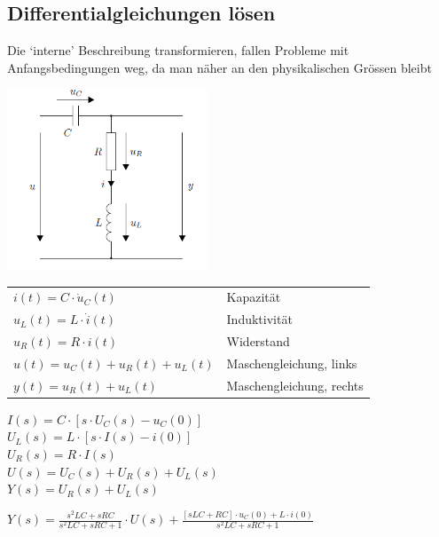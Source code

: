 \subsection{Differentialgleichungen lösen}
Die ‘interne’ Beschreibung transformieren, fallen Probleme mit Anfangsbedingungen weg, da man näher
an den physikalischen Grössen bleibt
\begin{multicols}{2}
		\begin{center}
			\includegraphics[width=6cm]{./images/diffgleichung.png}
		\end{center}
	\columnbreak
\begin{center}
	\begin{tabular}{ll}
		$i(t) = C \cdot \dot{u}_{C}(t)$ & Kapazität  \\
		$u_{L}(t) = L \cdot \dot{i}(t)$ & Induktivität \\
		$u_{R}(t) = R \cdot i(t)$ & Widerstand \\
		$u(t) = u_{C}(t) + u_{R}(t) + u_{L}(t)$ & Maschengleichung, links \\
		$y(t) = u_{R}(t) + u_{L}(t)$ & Maschengleichung, rechts \\
	\end{tabular}
\end{center}
\end{multicols}

\begin{multicols}{2}
{	$I(s) = C  \cdot  [s  \cdot  U_{C}(s) - u_{C}(0)]$ \\
	$U_{L}(s) = L  \cdot  [s  \cdot  I(s) - i(0)]$ \\
	$U_{R}(s) = R  \cdot  I(s)$ \\
	$U(s) = U_{C}(s) + U_{R}(s) + U_{L}(s)$ \\
	$Y (s) = U_{R}(s) + U_{L}(s)$ \\}

	\columnbreak
\begin{center}
$Y(s) = \frac{s^2 LC+sRC}{s^2 LC +sRC +1}\cdot U(s) + \frac{[sLC + RC] \cdot u_{C}(0) + L \cdot i(0)}{s^2 LC +sRC +1}$
\end{center}
\end{multicols}

